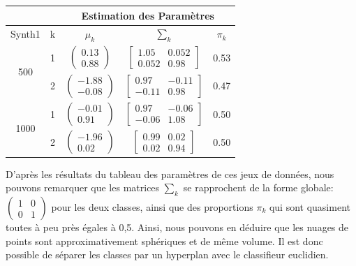 \documentclass[10pt]{article}
\begin{document}
		\begin{center}		
		\begin{tabular}{ | c | c | c | c | c |}
			\rowcolor{lightgray}
			& &  \multicolumn{3}{c|}{Estimation des Paramètres} \\
			\hline  
			 Synth1 & k & $\mu_{k}$ & $\sum_{k}$ & $\pi_{k} $\\
			\hline   											
			\multirow{2}{*}{500}        &   1&       $\begin{pmatrix} 0.13\\0.88 \end{pmatrix}$            &         	$\begin{bmatrix} 1.05 & 0.052 \\ 0.052 & 0.98 \end{bmatrix}$             & 			0.53		\\\cline{2-5}
			        											&   2&         $\begin{pmatrix} -1.88\\-0.08 \end{pmatrix}$         &  
			        											$\begin{bmatrix} 0.97 & -0.11 \\ -0.11 & 0.98 \end{bmatrix}$                      & 		0.47		\\
		
			\hline
			\hline
			\multirow{2}{*}{1000}         &   1&   $\begin{pmatrix} -0.01\\0.91 \end{pmatrix}$           &        	$\begin{bmatrix} 0.97 & -0.06  \\ -0.06  & 1.08\end{bmatrix}$          & 		0.50		\\\cline{2-5}
			         										&   2&       $\begin{pmatrix} -1.96\\0.02 \end{pmatrix}$            &    $\begin{bmatrix} 0.99 & 0.02 \\0.02 & 0.94 \end{bmatrix}$                  & 	0.50				\\
			\hline
			\end{tabular}
		\end{center}
	
	D'après les résultats du tableau des paramètres de ces jeux de données, nous pouvons remarquer que les matrices $\sum_{k}$ se rapprochent de la forme globale: $\begin{pmatrix} 1 & 0 \\ 0 & 1 \end{pmatrix}$ pour les deux classes, ainsi que des proportions $\pi_{k} $ qui sont quasiment toutes à peu près égales à 0,5. Ainsi, nous pouvons en déduire que les nuages de points sont approximativement sphériques et de même volume. Il est donc possible de séparer les classes par un hyperplan avec le classifieur euclidien.
	
\end{document}
